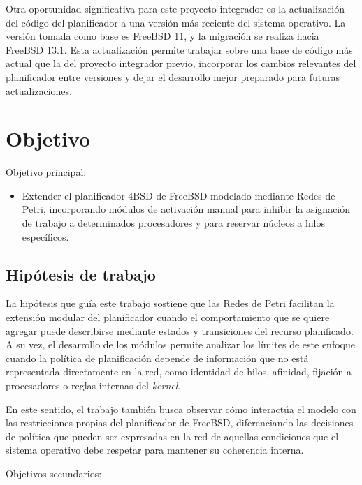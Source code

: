 Otra oportunidad significativa para este proyecto integrador es la actualización del código del planificador a una versión más reciente del sistema operativo. La versión tomada como base es FreeBSD 11, y la migración se realiza hacia FreeBSD 13.1. Esta actualización permite trabajar sobre una base de código más actual que la del proyecto integrador previo, incorporar los cambios relevantes del planificador entre versiones y dejar el desarrollo mejor preparado para futuras actualizaciones.\par

\section{Objetivo}

Objetivo principal:

\begin{itemize}
    \item Extender el planificador 4BSD de FreeBSD modelado mediante Redes de Petri, incorporando módulos de activación manual para inhibir la asignación de trabajo a determinados procesadores y para reservar núcleos a hilos específicos.
\end{itemize}

\subsection{Hipótesis de trabajo}

La hipótesis que guía este trabajo sostiene que las Redes de Petri facilitan la extensión modular del planificador cuando el comportamiento que se quiere agregar puede describirse mediante estados y transiciones del recurso planificado. A su vez, el desarrollo de los módulos permite analizar los límites de este enfoque cuando la política de planificación depende de información que no está representada directamente en la red, como identidad de hilos, afinidad, fijación a procesadores o reglas internas del \textit{kernel}.\par

En este sentido, el trabajo también busca observar cómo interactúa el modelo con las restricciones propias del planificador de FreeBSD, diferenciando las decisiones de política que pueden ser expresadas en la red de aquellas condiciones que el sistema operativo debe respetar para mantener su coherencia interna.\par

Objetivos secundarios:

